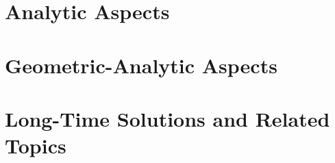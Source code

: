 

\part{Analytic Aspects}
\label{part:chow-et-al-ii}











\part{Geometric-Analytic Aspects}
\label{part:chow-et-al-iii}















\part{Long-Time Solutions and Related Topics}
\label{part:chow-et-al-iv}











